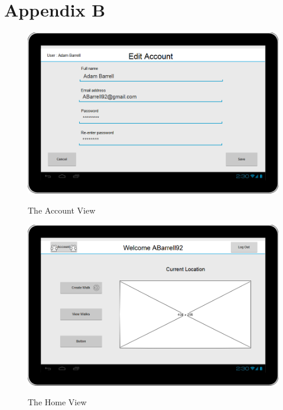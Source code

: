 \documentclass[11pt,a4paper]{article}
\begin{document}




\section{Appendix B}

\begin{figure}[H]
\begin{center}
\includegraphics[scale=0.5]{./img/Account.png}
\label{fig:accountView}
\caption{The Account View}
\end{center}
\end{figure}

\begin{figure}[H]
\begin{center}
\includegraphics[scale=0.5]{HomeView.png}
\label{fig:homeView}
\caption{The Home View}
\end{center}
\end{figure}
\end{document}

